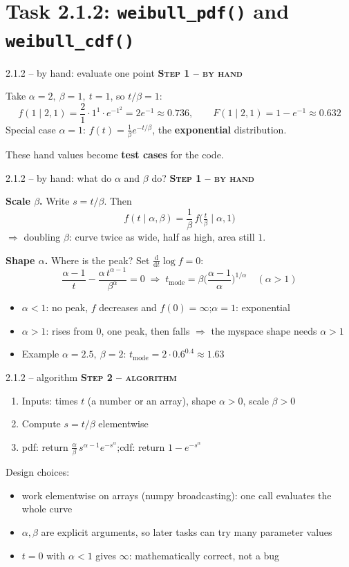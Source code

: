 \documentclass[aspectratio=169,11pt]{beamer}
\newcommand{\stage}[2]{{\color{#1}\bfseries\small\textsc{#2}}\par\smallskip}
\newcommand{\Byhand}{\stage{hand}{Step 1 -- by hand}}
\newcommand{\Algo}{\stage{algo}{Step 2 -- algorithm}}
\begin{document}
\section{Task 2.1.2: \texttt{weibull\_pdf()} and \texttt{weibull\_cdf()}}

\begin{frame}{2.1.2 -- by hand: evaluate one point}
\Byhand
Take $\alpha=2,\ \beta=1,\ t=1$, so $t/\beta=1$:
\[
f(1\mid2,1)=\frac21\cdot1^{1}\cdot e^{-1^2}=2e^{-1}\approx0.736,
\qquad
F(1\mid2,1)=1-e^{-1}\approx0.632
\]
Special case $\alpha=1$: $f(t)=\tfrac1\beta e^{-t/\beta}$, the \textbf{exponential} distribution.
\medskip

These hand values become \textbf{test cases} for the code.
\end{frame}

\begin{frame}{2.1.2 -- by hand: what do $\alpha$ and $\beta$ do?}\small
\Byhand
\textbf{Scale $\beta$.} Write $s=t/\beta$. Then
\[f(t\mid\alpha,\beta)=\frac1\beta\,f\big(\tfrac t\beta\mid\alpha,1\big)\]
$\Rightarrow$ doubling $\beta$: curve twice as wide, half as high, area still $1$.

\textbf{Shape $\alpha$.} Where is the peak? Set $\frac{\mathrm d}{\mathrm dt}\log f=0$:
\[
\frac{\alpha-1}{t}-\frac{\alpha\,t^{\alpha-1}}{\beta^\alpha}=0
\;\Longrightarrow\;
t_{\text{mode}}=\beta\Big(\frac{\alpha-1}{\alpha}\Big)^{1/\alpha}\quad(\alpha>1)
\]
\begin{itemize}
\item $\alpha<1$: no peak, $f$ decreases and $f(0)=\infty$;\quad $\alpha=1$: exponential
\item $\alpha>1$: rises from $0$, one peak, then falls $\Rightarrow$ the myspace shape needs $\alpha>1$
\item Example $\alpha=2.5,\ \beta=2$: $t_{\text{mode}}=2\cdot0.6^{0.4}\approx1.63$
\end{itemize}
\end{frame}

\begin{frame}{2.1.2 -- algorithm}
\Algo
\begin{enumerate}
\item Inputs: times $t$ (a number or an array), shape $\alpha>0$, scale $\beta>0$
\item Compute $s=t/\beta$ elementwise
\item pdf: return $\frac\alpha\beta\,s^{\alpha-1}e^{-s^\alpha}$;\quad cdf: return $1-e^{-s^\alpha}$
\end{enumerate}
\medskip
Design choices:
\begin{itemize}
\item work elementwise on arrays (numpy broadcasting): one call evaluates the whole curve
\item $\alpha,\beta$ are explicit arguments, so later tasks can try many parameter values
\item $t=0$ with $\alpha<1$ gives $\infty$: mathematically correct, not a bug
\end{itemize}
\end{frame}
\end{document}
